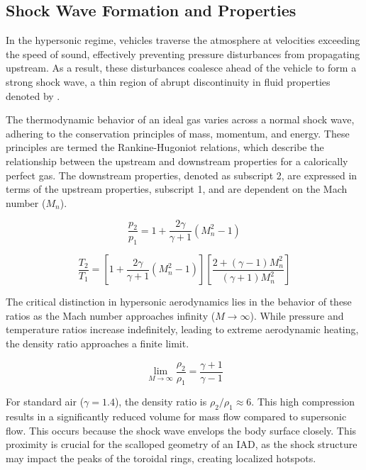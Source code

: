 \subsection{Shock Wave Formation and Properties}

In the hypersonic regime, vehicles traverse the atmosphere at velocities exceeding the speed of sound, effectively preventing pressure disturbances from propagating upstream. As a result, these disturbances coalesce ahead of the vehicle to form a strong shock wave, a thin region of abrupt discontinuity in fluid properties denoted by \cite{AndersonHypersonic}.
\par
The thermodynamic behavior of an ideal gas varies across a normal shock wave, adhering to the conservation principles of mass, momentum, and energy. These principles are termed the Rankine-Hugoniot relations, which describe the relationship between the upstream and downstream properties for a calorically perfect gas. The downstream properties, denoted as subscript 2, are expressed in terms of the upstream properties, subscript 1, and are dependent on the Mach number ($M_n$).
\par
\begin{equation}
    \frac{p_2}{p_1} = 1 + \frac{2\gamma}{\gamma + 1} (M_n^2 - 1)
\end{equation}

\begin{equation}
    \frac{T_2}{T_1} = \left[1 + \frac{2\gamma}{\gamma + 1} (M_n^2 - 1)\right] \left[ \frac{2 + (\gamma - 1)M_n^2}{(\gamma + 1)M_n^2} \right]
\end{equation}

The critical distinction in hypersonic aerodynamics lies in the behavior of these ratios as the Mach number approaches infinity ($M \to \infty$). While pressure and temperature ratios increase indefinitely, leading to extreme aerodynamic heating, the density ratio approaches a finite limit.

\begin{equation}
    \lim_{M \to \infty} \frac{\rho_2}{\rho_1} = \frac{\gamma + 1}{\gamma - 1}
\end{equation}

For standard air ($\gamma = 1.4$), the density ratio is $\rho_2/\rho_1 \approx 6$. This high compression results in a significantly reduced volume for mass flow compared to supersonic flow. This occurs because the shock wave envelops the body surface closely. This proximity is crucial for the scalloped geometry of an IAD, as the shock structure may impact the peaks of the toroidal rings, creating localized hotspots.

